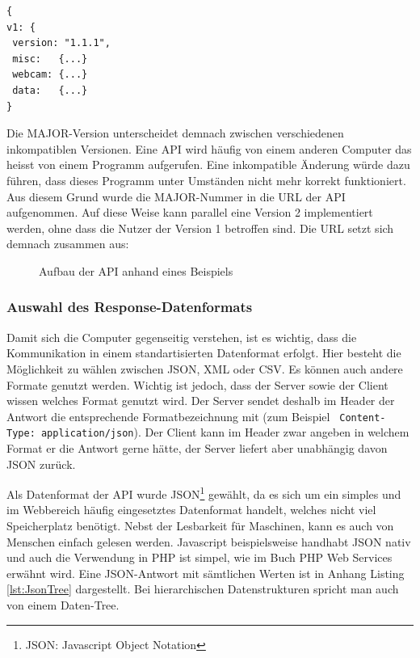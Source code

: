 \vspace{3mm}
\begin{lstlisting}[label=lst:versionierung,caption=Versionierungsangabe auf der obersten Hierarchiestufe, language=HTML5, style=php]
{
v1: {
 version: "1.1.1",
 misc:   {...}
 webcam: {...}
 data:   {...}
}
\end{lstlisting}
\vspace{3mm}

\noindent
Die MAJOR-Version unterscheidet demnach zwischen verschiedenen inkompatiblen Versionen. Eine API wird häufig von einem anderen Computer das heisst von einem Programm aufgerufen. Eine inkompatible Änderung würde dazu führen, dass dieses Programm unter Umständen nicht mehr korrekt funktioniert. Aus diesem Grund wurde die MAJOR-Nummer in die URL der API aufgenommen. Auf diese Weise kann parallel eine Version 2 implementiert werden, ohne dass die Nutzer der Version 1 betroffen sind. Die URL setzt sich demnach zusammen aus:

\begin{figure}[htbp!]
	\centering
	\caption{Aufbau der API anhand eines Beispiels}
	\label{img:apiformat}
\end{figure}


\subsubsection{Auswahl des Response-Datenformats}
Damit sich die Computer gegenseitig verstehen, ist es wichtig, dass die Kommunikation in einem standartisierten Datenformat erfolgt. Hier besteht die Möglichkeit zu wählen zwischen JSON, XML oder CSV. Es können auch andere Formate genutzt werden. Wichtig ist jedoch, dass der Server sowie der Client wissen welches Format genutzt wird. Der Server sendet deshalb im Header der Antwort die entsprechende Formatbezeichnung mit (zum Beispiel \texttt{ Content-Type: application/json}). Der Client kann im Header zwar angeben in welchem Format er die Antwort gerne hätte, der Server liefert aber unabhängig davon JSON zurück.

Als Datenformat der API wurde JSON\footnote{JSON: Javascript Object Notation} gewählt, da es sich um ein simples und im Webbereich häufig eingesetztes Datenformat handelt, welches nicht viel Speicherplatz benötigt. Nebst der Lesbarkeit für Maschinen, kann es auch von Menschen einfach gelesen werden. Javascript beispielsweise handhabt JSON nativ und auch die Verwendung in PHP ist simpel, wie im Buch PHP Web Services \cite{LornaJaneMitchell2013oreilly} erwähnt wird. Eine JSON-Antwort mit sämtlichen Werten ist in Anhang Listing \ref{lst:JsonTree} dargestellt. Bei hierarchischen Datenstrukturen spricht man auch von einem Daten-Tree.

